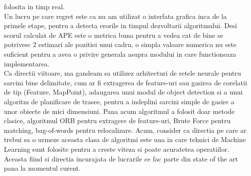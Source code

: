 \documentclass[12pt,a4paper]{report}
\begin{document}
folosita in timp real. \\
Un lucru pe care regret este ca nu am utilizat o interfata grafica inca de la 
primele etape, pentru a detecta erorile in timpul dezvoltarii algoritmului. Desi scorul
calculat de APE este o metrica buna pentru a vedea cat de bine se potrivesc 2 
estimari ale pozitiei unui cadru, o simpla valoare numerica nu este suficient
pentru a avea o privire generala asupra modului in care functioneaza implementarea. \\
Ca directii viitoare, ma gandeam sa utilizez arhitecturi de retele neurale pentru
sarcini bine delimitate, cum ar fi extragerea de feature-uri sau gasirea de corelatii
de tip (Feature, MapPoint), adaugarea unui modul de object detection si a unui 
algoritm de planificare de trasee, pentru a indeplini sarcini simple de gasire 
a unor obiecte de mici dimensiuni. Pana acum algoritmul a folosit doar metode
clasice, algoritmul ORB pentru extragere de feature-uri, Brute Force pentru 
matching, bag-of-words pentru relocalizare. Acum, consider ca directia pe care ar
trebui sa o urmeze aceasta clasa de algoritmi este una in care tehnici de Machine
Learning sunt folosite pentru a creste viteza si poate acuratetea operatiilor. 
Aceasta fiind si directia incurajata de lucrarile ce fac parte din state of the art
pana la momentul curent.
\end{document}
